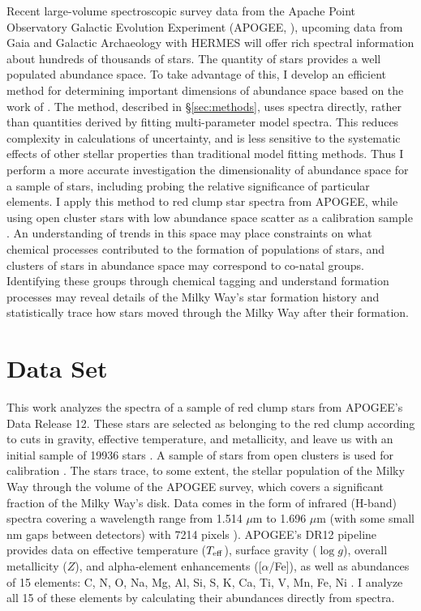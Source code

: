 \documentclass[preprint]{aastex}
\begin{document}
Recent large-volume spectroscopic survey data from the Apache Point Observatory Galactic Evolution Experiment (APOGEE, \citealt{APOGEE}), upcoming data from Gaia \citep{GAIA} and Galactic Archaeology with HERMES \citep{galah} will offer rich spectral information about hundreds of thousands of stars. The quantity of stars provides a well populated abundance space. To take advantage of this, I develop an efficient method for determining important dimensions of abundance space based on the work of \citealt{openclusters}. The method, described in \S\ref{sec:methods}, uses spectra directly, rather than quantities derived by fitting multi-parameter model spectra. This reduces complexity in calculations of uncertainty, and is less sensitive to the systematic effects of other stellar properties than traditional model fitting methods. Thus I perform a more accurate investigation the dimensionality of abundance space for a sample of stars, including probing the relative significance of particular elements. I apply this method to red clump star spectra from APOGEE, while using open cluster stars with low abundance space scatter as a calibration sample . An understanding of trends in this space may place constraints on what chemical processes contributed to the formation of populations of stars, and clusters of stars in abundance space may correspond to co-natal groups. Identifying these groups through chemical tagging and understand formation processes may reveal details of the Milky Way's star formation history and statistically trace how stars moved through the Milky Way after their formation.


\section{Data Set}
\label{sec:data}
This work analyzes the spectra of a sample of red clump stars from APOGEE's Data Release 12. These stars are selected as belonging to the red clump according to cuts in gravity, effective temperature, and metallicity, and leave us with an initial sample of 19936 stars \citep{bovy2014}. A sample of stars from open clusters is used for calibration \citep{openclusters}. The stars trace, to some extent, the stellar population of the Milky Way through the volume of the APOGEE survey, which covers a significant fraction of the Milky Way’s disk. Data comes in the form of infrared (H-band) spectra covering a wavelength range from 1.514 $\mu$m to 1.696 $\mu$m (with some small nm gaps between detectors) with 7214 pixels \cite{APOGEE}). APOGEE's DR12 pipeline \citep{ASPCAP} provides data on effective temperature ($T_{\rm eff}$), surface gravity ($\log g$), overall metallicity ($Z$), and alpha-element enhancements ([$\alpha$/Fe]), as well as abundances of 15 elements: C, N, O, Na, Mg, Al, Si, S, K, Ca, Ti, V, Mn, Fe, Ni \citep{holtzman2015}. I analyze all 15 of these elements by calculating their abundances directly from spectra.
\end{document}
